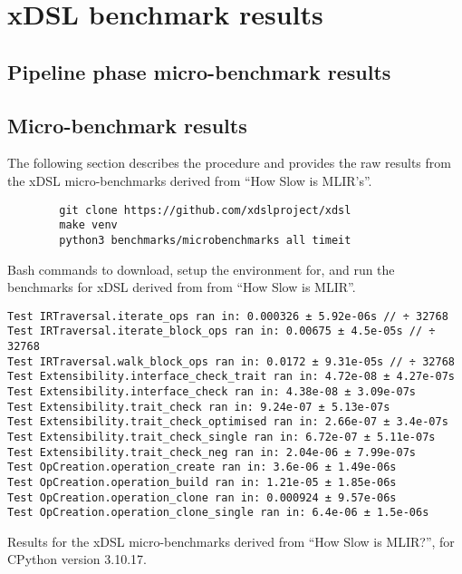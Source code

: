 \chapter{xDSL benchmark results}
\label{chap:xdsl-benchmark-results}

\section{Pipeline phase micro-benchmark results}

\section{Micro-benchmark results}

The following section describes the procedure and provides the raw results from the xDSL micro-benchmarks derived from ``How Slow is MLIR's''.

\vspace{2em}

\begin{code}
    \begin{verbatim}
        git clone https://github.com/xdslproject/xdsl
        make venv
        python3 benchmarks/microbenchmarks all timeit
    \end{verbatim}
    \caption{Bash commands to download, setup the environment for, and run the benchmarks for xDSL derived from from ``How Slow is MLIR''.}
    \label{listing:bash-xdsl-ubench-run}
\end{code}

\vspace{2em}

\begin{code}
    \begin{verbatim}
Test IRTraversal.iterate_ops ran in: 0.000326 ± 5.92e-06s // ÷ 32768
Test IRTraversal.iterate_block_ops ran in: 0.00675 ± 4.5e-05s // ÷ 32768
Test IRTraversal.walk_block_ops ran in: 0.0172 ± 9.31e-05s // ÷ 32768
Test Extensibility.interface_check_trait ran in: 4.72e-08 ± 4.27e-07s
Test Extensibility.interface_check ran in: 4.38e-08 ± 3.09e-07s
Test Extensibility.trait_check ran in: 9.24e-07 ± 5.13e-07s
Test Extensibility.trait_check_optimised ran in: 2.66e-07 ± 3.4e-07s
Test Extensibility.trait_check_single ran in: 6.72e-07 ± 5.11e-07s
Test Extensibility.trait_check_neg ran in: 2.04e-06 ± 7.99e-07s
Test OpCreation.operation_create ran in: 3.6e-06 ± 1.49e-06s
Test OpCreation.operation_build ran in: 1.21e-05 ± 1.85e-06s
Test OpCreation.operation_clone ran in: 0.000924 ± 9.57e-06s
Test OpCreation.operation_clone_single ran in: 6.4e-06 ± 1.5e-06s
    \end{verbatim}
    \caption{Results for the xDSL micro-benchmarks derived from ``How Slow is MLIR?'', for CPython version 3.10.17.}
    \label{listing:how-slow-is-mlir-xdsl-microbenchmark-results}
\end{code}
